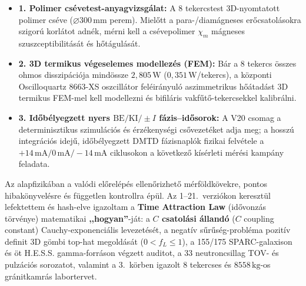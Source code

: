 \documentclass[10pt,a4paper]{article}
\begin{document}
{
\begin{itemize}\setlength{\itemsep}{1pt}\setlength{\parskip}{0pt}\setlength{\topsep}{1pt}
  \item \textbf{1. Polimer cs\'evetest-anyagvizsg\'alat:} A 8 tekercstest 3D-nyomtatott polimer cs\'eve ($\varnothing 300\,\text{mm}$ perem). Miel\H{o}tt a para-/diam\'agneses er\H{o}csatol\'asokra szigor\'u korl\'atot adn\'ek, m\'erni kell a cs\'evepolimer $\chi_m$ m\'agneses szuszceptibilit\'as\'at \'es h\H{o}t\'agul\'as\'at.
  \item \textbf{2. 3D termikus v\'egeselemes modellez\'es (FEM):} B\'ar a 8 tekercs \"osszes ohmos disszip\'aci\'oja mind\"ossze $2{,}805\,\text{W}$ ($0{,}351\,\text{W}$/tekercs), a k\"ozponti Oscilloquartz 8663-XS oszcill\'ator fel\'eir\'anyul\'o aszimmetrikus h\H{o}\'atad\'ast 3D termikus FEM-mel kell modellezni \'es bifil\'aris vakf\H{u}t\H{o}-tekercsekkel kalibr\'alni.
  \item \textbf{3. Id\H{o}b\'elyegzett nyers $\text{BE}/\text{KI}/\pm I$ f\'azis--id\H{o}sorok:} A V20 csomag a determinisztikus szimul\'aci\'os \'es \'erz\'ekenys\'egi cs\H{o}vezet\'eket adja meg; a hossz\'u integr\'aci\'os idej\H{u}, id\H{o}b\'elyegzett DMTD f\'azisnapl\'ok fizikai felv\'etele a $+14\,\text{mA} / 0\,\text{mA} / -14\,\text{mA}$ ciklusokon a k\"ovetkez\H{o} k\'is\'erleti m\'er\'esi kamp\'any feladata.
\end{itemize}

\vspace{0.5mm}
\noindent{\color{navy}\rule{\linewidth}{0.6pt}}\par\vspace{0.8mm}
\par\vspace{0.5pt}
Az alapfizik\'aban a val\'odi el\H{o}rel\'ep\'es ellen\H{o}rizhet\H{o} m\'erf\"oldk\"ovekre, pontos hibak\"onyvel\'esre \'es f\"uggetlen kontrollra \'ep\"ul. Az 1--21.\ verzi\'okon kereszt\"ul lefektettem \'es hash-elve igazoltam a \textbf{Time Attraction Law} (id\H{o}vonz\'as t\"orv\'enye) matematikai \textbf{,,hogyan''}-j\'at: a \textbf{$C$ csatol\'asi \'alland\'o} ($C$ coupling constant) Cauchy-exponenci\'alis levezet\'es\'et, a negat\'iv s\H{u}r\H{u}s\'eg-probl\'ema pozit\'iv definit 3D g\"ombi top-hat megold\'as\'at ($0 < f_L \le 1$), a 155/175 SPARC-galaxison \'es \"ot H.E.S.S. gamma-forr\'ason v\'egzett auditot, a 33 neutroncsillag TOV- \'es pulz\'aci\'os sorozatot, valamint a 3.\ k\"orben igazolt 8 tekercses \'es $8558\,\text{kg}$-os gr\'anitkamr\'as labortervet.

}
\end{document}
